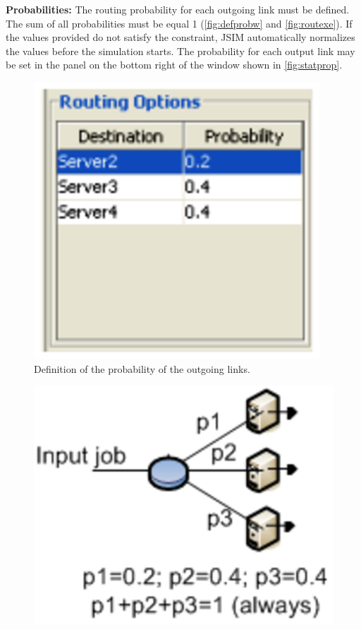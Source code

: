 \begin{itemize*}
\item \textbf{Probabilities:} The routing probability for each
outgoing link must be defined. The sum of all probabilities must
be equal 1 (\autoref{fig:defprobw} and \autoref{fig:routexe}). If the
values provided do not satisfy the constraint, JSIM automatically
normalizes the values before the simulation starts. The
probability for each output link may be set in the panel on the
bottom right of the window shown in \autoref{fig:statprop}.
\begin{figure}[h!]
    \begin{center}
        \includegraphics[scale=.5]{img/jsimg/8.9.eps}
    \end{center}
    \caption{Definition of the probability of the outgoing links.}
    \label{fig:defprobw}
\end{figure}
\begin{figure}[h!]
    \begin{center}
        \includegraphics[scale=.5]{img/jsimg/8.10.eps}

\end{center}
\end{figure}
\end{itemize*}
